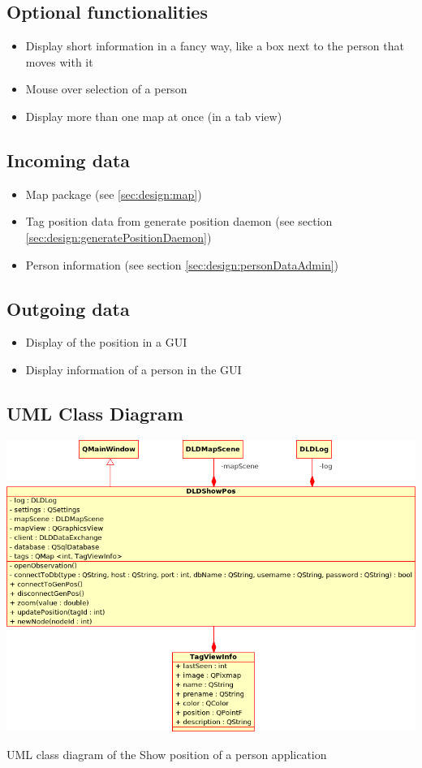    \subsection{Optional functionalities}
    \begin{itemize}
     \item Display short information in a fancy way, like a box next to the person that moves with it
     \item Mouse over selection of a person
     \item Display more than one map at once (in a tab view)
    \end{itemize}

   \subsection{Incoming data}
    \begin{itemize}
     \item Map package (see \ref{sec:design:map})
     \item Tag position data from generate position daemon (see section \ref{sec:design:generatePositionDaemon})
     \item Person information (see section \ref{sec:design:personDataAdmin})
    \end{itemize}

   \subsection{Outgoing data}
    \begin{itemize}
     \item Display of the position in a GUI
     \item Display information of a person in the GUI
    \end{itemize}

   \subsection{UML Class Diagram}
    \begin{staticFigure}
     \centering
     \includegraphics[scale=0.5]{UMLDiagrams/dldShowPos.png}
     \caption{UML class diagram of the Show position of a person application}
     \label{fg:projectModularization:showPos}
    \end{staticFigure}

